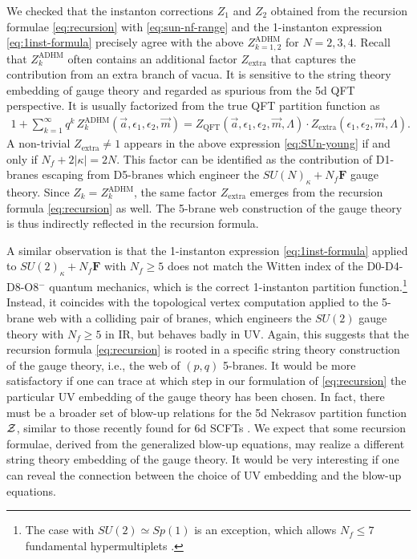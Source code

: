 \documentclass[letterpaper, 11pt]{article}
\def\CZ{{\cal Z}}
\def\e{\epsilon}
\begin{document}
{We checked that the instanton corrections $Z_1$ and $Z_2$ obtained from the recursion formulae \eqref{eq:recursion} with \eqref{eq:sun-nf-range} and the 1-instanton expression \eqref{eq:1inst-formula} precisely agree with the above  $Z_{k=1,2}^\text{ADHM}$ for $N=2,3,4$. Recall that $Z_k^\text{ADHM}$ often contains an additional factor $Z_\text{extra}$ that captures the contribution from an extra branch of vacua. It is sensitive to the string theory embedding of gauge theory and regarded as spurious from the 5d QFT perspective. It is usually factorized from the true QFT partition function as 
\begin{align}
  \textstyle 1 + \sum_{k=1}^\infty q^k \,Z_k^\text{ADHM}(\vec{a}, \e_{1},\e_2, \vec{m}) = Z_\text{QFT}(\vec{a}, \e_{1},\e_2, \vec{m},\Lambda) \cdot Z_\text{extra}(\e_{1},\e_2,  \vec{m},\Lambda).
\end{align}
A non-trivial $Z_\text{extra}\neq 1$ appears in the above expression \eqref{eq:SUn-young} if and only if $N_f + 2|\kappa| = 2N$. This factor can be identified as the contribution of D1-branes escaping from D5-branes which engineer the $SU(N)_\kappa + N_f\mathbf{F}$ gauge theory. Since $Z_k = Z_k^\text{ADHM}$, the same factor $Z_\text{extra}$ emerges from the recursion formula \eqref{eq:recursion} as well. The 5-brane web construction of the gauge theory is thus indirectly reflected in the recursion formula. 

A similar observation is that the 1-instanton expression \eqref{eq:1inst-formula} applied to $SU(2)_\kappa+N_f\mathbf{F}$ with $N_f \geq 5$ does not match the Witten index of the D0-D4-D8-O8${}^-$  quantum mechanics, which is the correct 1-instanton partition function.\footnote{The case with $SU(2) \simeq Sp(1
)$ is an exception, which allows $N_f \leq 7$ fundamental hypermultiplets \cite{Seiberg:1996bd}.} Instead, it coincides with the topological vertex computation applied to the 5-brane web with a colliding pair of branes, which engineers the $SU(2)$ gauge theory with $N_f \geq 5$ in IR, but behaves badly in UV. Again, this suggests that the recursion formula \eqref{eq:recursion} is rooted in a specific string theory construction of the gauge theory, i.e., the web of $(p,q)$ 5-branes. It would be more satisfactory if one can trace at which step in our formulation of \eqref{eq:recursion} the particular UV embedding of the gauge theory has been chosen. 
In fact, there must be a broader set of blow-up relations for the 5d Nekrasov partition function $\CZ$, similar to those recently found for 6d SCFTs \cite{Gu:2017ccq,Huang:2017mis,Gu:2018gmy,Gu:2019dan}. We expect that some recursion formulae, derived from the generalized blow-up equations, may realize a different string theory embedding of the gauge theory. It would be very interesting if one can reveal the connection between the choice of UV embedding and the blow-up equations.

}
\end{document}
